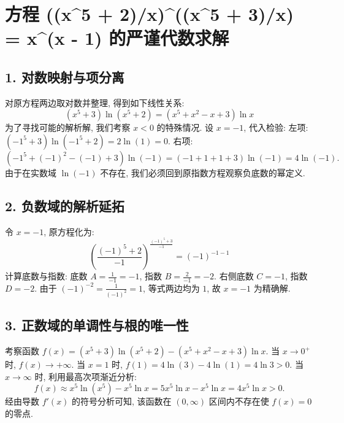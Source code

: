 \documentclass{article}
\begin{document}
\section*{方程 ((x^5 + 2)/x)^((x^5 + 3)/x) = x^(x - 1) 的严谨代数求解}

\subsection*{1. 对数映射与项分离}
对原方程两边取对数并整理, 得到如下线性关系:
\[ (x^5+3) \ln(x^5+2) = (x^5+x^2-x+3) \ln x \]
为了寻找可能的解析解, 我们考察 $x < 0$ 的特殊情况. 
设 $x = -1$, 代入检验:
左项: \((-1^5+3) \ln(-1^5+2) = 2 \ln(1) = 0.\)
右项: \((-1^5+(-1)^2-(-1)+3) \ln(-1) = (-1+1+1+3) \ln(-1) = 4 \ln(-1).\)
由于在实数域 $\ln(-1)$ 不存在, 我们必须回到原指数方程观察负底数的幂定义.

\subsection*{2. 负数域的解析延拓}
令 $x = -1$, 原方程化为:
\[ \left( \frac{(-1)^5+2}{-1} \right)^{\frac{(-1)^5+3}{-1}} = (-1)^{-1-1} \]
计算底数与指数:
底数 $A = \frac{1}{-1} = -1$, 指数 $B = \frac{2}{-1} = -2$.
右侧底数 $C = -1$, 指数 $D = -2$.
由于 $(-1)^{-2} = \frac{1}{(-1)^2} = 1$, 等式两边均为 $1$, 故 $x = -1$ 为精确解.

\subsection*{3. 正数域的单调性与根的唯一性}
考察函数 $f(x) = (x^5+3)\ln(x^5+2) - (x^5+x^2-x+3)\ln x$. 
当 $x \to 0^+$ 时, $f(x) \to +\infty$. 
当 $x = 1$ 时, $f(1) = 4\ln(3) - 4\ln(1) = 4\ln 3 > 0$.
当 $x \to \infty$ 时, 利用最高次项渐近分析:
\[ f(x) \approx x^5 \ln(x^5) - x^5 \ln x = 5x^5 \ln x - x^5 \ln x = 4x^5 \ln x > 0. \]
经由导数 $f'(x)$ 的符号分析可知, 该函数在 $(0, \infty)$ 区间内不存在使 $f(x)=0$ 的零点.
\end{document}
